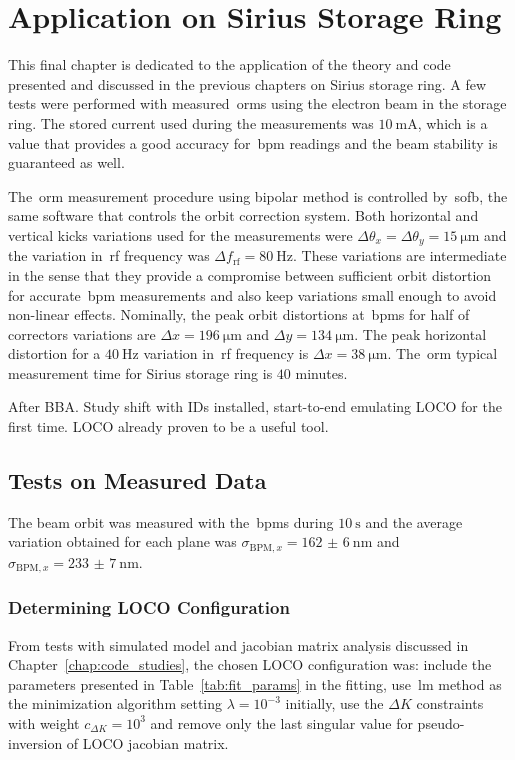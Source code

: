 \chapter{Application on Sirius Storage Ring}

This final chapter is dedicated to the application of the theory and code presented and discussed in the previous chapters on Sirius storage ring. A few tests were performed with measured~\glspl{orm} using the electron beam in the storage ring. The stored current used during the measurements was $\SI{10}{\milli\ampere}$, which is a value that provides a good accuracy for~\gls{bpm} readings and the beam stability is guaranteed as well.

The~\gls{orm} measurement procedure using  bipolar method is controlled by~\gls{sofb}, the same software that controls the orbit correction system. Both horizontal and vertical kicks variations used for the measurements were $\Delta \theta_x = \Delta \theta_y = \SI{15}{\micro\meter}$ and the variation in~\gls{rf} frequency was $\Delta f_{\mathrm{rf}} = \SI{80}{\hertz}$. These variations are intermediate in the sense that they provide a compromise between sufficient orbit distortion for accurate~\gls{bpm} measurements and also keep variations small enough to avoid non-linear effects. Nominally, the peak orbit distortions at~\glspl{bpm} for half of correctors variations are $\Delta x = \SI{196}{\micro\meter}$ and $\Delta y = \SI{134}{\micro\meter}$. The peak horizontal distortion for a $\SI{40}{\hertz}$ variation in~\gls{rf} frequency is $\Delta x = \SI{38}{\micro\meter}$. The~\gls{orm} typical measurement time for Sirius storage ring is $40$ minutes.

After BBA. Study shift with IDs installed, start-to-end emulating LOCO for the first time. LOCO already proven to be a useful tool.

\section{Tests on Measured Data}

The beam orbit was measured  with the~\glspl{bpm} during $\SI{10}{\second}$ and the average variation obtained for each plane was $\sigma_{\mathrm{BPM}, x} = \SI{162(6)}{\nano\meter}$ and $\sigma_{\mathrm{BPM}, x} = \SI{233(7)}{\nano\meter}$.

\subsection{Determining LOCO Configuration}\label{subsec:loco_config}
From tests with simulated model and jacobian matrix analysis discussed in Chapter~\ref{chap:code_studies}, the chosen LOCO configuration was: include the parameters presented in Table~\ref{tab:fit_params} in the fitting, use~\gls{lm} method as the minimization algorithm setting $\lambda = 10^{-3}$ initially, use the $\Delta K$ constraints with weight $c_{\Delta K} = 10^{3}$ and remove only the last singular value for pseudo-inversion of LOCO jacobian matrix. 

